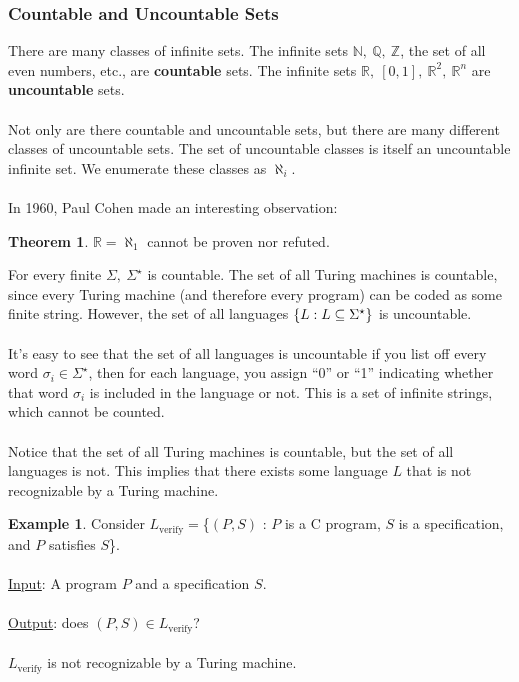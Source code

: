\documentclass[]{article}
\DeclarePairedDelimiter{\set}{\lbrace}{\rbrace}
\theoremstyle{definition}
\newtheorem*{theorem}{Theorem}
\newtheorem{ex}{Example}[section]
\begin{document}
    \subsubsection{Countable and Uncountable Sets}
      There are many classes of infinite sets. The infinite sets $\mathbb{N},~ \mathbb{Q},~ \mathbb{Z}$, the set of all even numbers, etc., are \textbf{countable} sets. The infinite sets $\mathbb{R},~ [0, 1],~ \mathbb{R}^2,~ \mathbb{R}^n$ are \textbf{uncountable} sets.
      \\ \\
      Not only are there countable and uncountable sets, but there are many different classes of uncountable sets. The set of uncountable classes is itself an uncountable infinite set. We enumerate these classes as $\aleph_i$.
      \\ \\
      In 1960, Paul Cohen made an interesting observation:
      \begin{theorem}
        $\mathbb{R} = \aleph_1$ cannot be proven nor refuted.
      \end{theorem}

      For every finite $\Sigma,~ \Sigma^\star$ is countable. The set of all Turing machines is countable, since every Turing machine (and therefore every program) can be coded as some finite string. However, the set of all languages $\set{L : L \subseteq \Sigma^\star}$ is uncountable.
      \\ \\
      It's easy to see that the set of all languages is uncountable if you list off every word $\sigma_i \in \Sigma^\star$, then for each language, you assign ``0'' or ``1'' indicating whether that word $\sigma_i$ is included in the language or not. This is a set of infinite strings, which cannot be counted.
      \\ \\
      Notice that the set of all Turing machines is countable, but the set of all languages is not. This implies that there exists some language $L$ that is not recognizable by a Turing machine.
      \begin{ex}
        Consider $L_\text{verify} = $\{$(P, S)$ : $P$ is a C program, $S$ is a specification, and $P$ satisfies $S$\}.
        \\ \\
        \underline{Input}: A program $P$ and a specification $S$.
        \\ \\
        \underline{Output}: does $(P, S) \in L_\text{verify}$?
        \\ \\
        $L_\text{verify}$ is not recognizable by a Turing machine.
      \end{ex}
\end{document}

